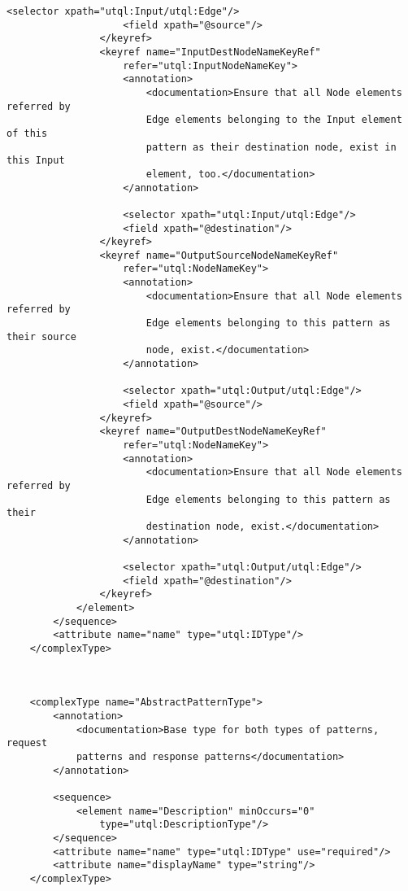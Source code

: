 \documentclass[11pt]{article}
\begin{document}
\begin{Verbatim}[fontsize=\footnotesize,tabsize=2]
                    <selector xpath="utql:Input/utql:Edge"/>
                    <field xpath="@source"/>
                </keyref>
                <keyref name="InputDestNodeNameKeyRef"
                    refer="utql:InputNodeNameKey">
                    <annotation>
                        <documentation>Ensure that all Node elements referred by
                        Edge elements belonging to the Input element of this
                        pattern as their destination node, exist in this Input
                        element, too.</documentation>
                    </annotation>
                    
                    <selector xpath="utql:Input/utql:Edge"/>
                    <field xpath="@destination"/>
                </keyref> 
                <keyref name="OutputSourceNodeNameKeyRef"
                    refer="utql:NodeNameKey">
                    <annotation>
                        <documentation>Ensure that all Node elements referred by
                        Edge elements belonging to this pattern as their source
                        node, exist.</documentation>
                    </annotation>
                    
                    <selector xpath="utql:Output/utql:Edge"/>
                    <field xpath="@source"/>
                </keyref>
                <keyref name="OutputDestNodeNameKeyRef"
                    refer="utql:NodeNameKey">
                    <annotation>
                        <documentation>Ensure that all Node elements referred by
                        Edge elements belonging to this pattern as their
                        destination node, exist.</documentation>
                    </annotation>
                    
                    <selector xpath="utql:Output/utql:Edge"/>
                    <field xpath="@destination"/>
                </keyref> 
            </element>
        </sequence>
        <attribute name="name" type="utql:IDType"/>
    </complexType>
    
    
    
    <complexType name="AbstractPatternType">
        <annotation>
            <documentation>Base type for both types of patterns, request
            patterns and response patterns</documentation>
        </annotation>
        
        <sequence>
            <element name="Description" minOccurs="0"
				type="utql:DescriptionType"/>
        </sequence>
        <attribute name="name" type="utql:IDType" use="required"/>
        <attribute name="displayName" type="string"/>
    </complexType>
    

\end{Verbatim}
\end{document}

